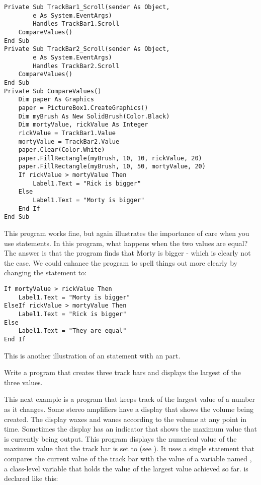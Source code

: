 				\begin{lstlisting}
Private Sub TrackBar1_Scroll(sender As Object,
		e As System.EventArgs)
		Handles TrackBar1.Scroll
	CompareValues()
End Sub
Private Sub TrackBar2_Scroll(sender As Object,
		e As System.EventArgs)
		Handles TrackBar2.Scroll
	CompareValues()
End Sub
Private Sub CompareValues()
	Dim paper As Graphics
	paper = PictureBox1.CreateGraphics()
	Dim myBrush As New SolidBrush(Color.Black)
	Dim mortyValue, rickValue As Integer
	rickValue = TrackBar1.Value
	mortyValue = TrackBar2.Value
	paper.Clear(Color.White)
	paper.FillRectangle(myBrush, 10, 10, rickValue, 20)
	paper.FillRectangle(myBrush, 10, 50, mortyValue, 20)
	If rickValue > mortyValue Then
		Label1.Text = "Rick is bigger"
	Else
		Label1.Text = "Morty is bigger"
	End If
End Sub
		\end{lstlisting}
		This program works fine, but again illustrates the importance of care when you use  statements. In this program, what happens when the two values are equal? The answer is that the program finds that Morty is bigger - which is clearly not the case. We could enhance the program to spell things out more clearly by changing the  statement to:
		\begin{lstlisting}
If mortyValue > rickValue Then
	Label1.Text = "Morty is bigger"
ElseIf rickValue > mortyValue Then
	Label1.Text = "Rick is bigger"
Else
	Label1.Text = "They are equal"
End If
		\end{lstlisting}
		This is another illustration of an  statement with an  part.

		\begin{stqb}
			\begin{STQ}
				\item	Write a program that creates three track bars and displays the largest of the three values.
			\end{STQ}
		\end{stqb}

		This next example is a program that keeps track of the largest value of a number as it changes. Some stereo amplifiers have a display that shows the volume being created. The display waxes and wanes according to the volume at any point in time. Sometimes the display has an indicator that shows the maximum value that is currently being output. This program displays the numerical value of the maximum value that the track bar is set to (see ). It uses a single  statement that compares the current value of the track bar with the value of a variable named , a class-level variable that holds the value of the largest value achieved so far.  is declared like this:

